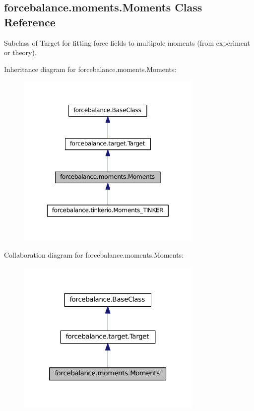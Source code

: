 \hypertarget{classforcebalance_1_1moments_1_1Moments}{\subsection{forcebalance.\-moments.\-Moments Class Reference}
\label{classforcebalance_1_1moments_1_1Moments}
}


Subclass of Target for fitting force fields to multipole moments (from experiment or theory).  




Inheritance diagram for forcebalance.\-moments.\-Moments\-:\nopagebreak
\begin{figure}[H]
\begin{center}
\leavevmode
\includegraphics[width=254pt]{classforcebalance_1_1moments_1_1Moments__inherit__graph}
\end{center}
\end{figure}


Collaboration diagram for forcebalance.\-moments.\-Moments\-:\nopagebreak
\begin{figure}[H]
\begin{center}
\leavevmode
\includegraphics[width=254pt]{classforcebalance_1_1moments_1_1Moments__coll__graph}
\end{center}
\end{figure}
